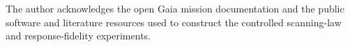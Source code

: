 \begin{acknowledgements}
The author acknowledges the open Gaia mission documentation and the public software and literature resources used to construct the controlled scanning-law and response-fidelity experiments.
\end{acknowledgements}
